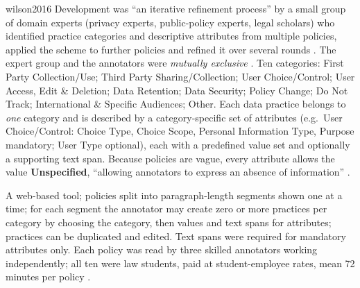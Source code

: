 \begin{papercard}{wilson2016}
 Development was ``an iterative refinement process'' by a small group of domain experts (privacy experts, public-policy experts, legal scholars) who identified practice categories and descriptive attributes from multiple policies, applied the scheme to further policies and refined it over several rounds . The expert group and the annotators were \emph{mutually exclusive} . Ten categories: First Party Collection/Use; Third Party Sharing/Collection; User Choice/Control; User Access, Edit \& Deletion; Data Retention; Data Security; Policy Change; Do Not Track; International \& Specific Audiences; Other. Each data practice belongs to \emph{one} category and is described by a category-specific set of attributes (e.g.\ User Choice/Control: Choice Type, Choice Scope, Personal Information Type, Purpose mandatory; User Type optional), each with a predefined value set and optionally a supporting text span. Because policies are vague, every attribute allows the value \textbf{Unspecified}, ``allowing annotators to express an absence of information'' .

 A web-based tool; policies split into paragraph-length segments shown one at a time; for each segment the annotator may create zero or more practices per category by choosing the category, then values and text spans for attributes; practices can be duplicated and edited. Text spans were required for mandatory attributes only. Each policy was read by three skilled annotators working independently; all ten were law students, paid at student-employee rates, mean 72 minutes per policy .


\end{papercard}
